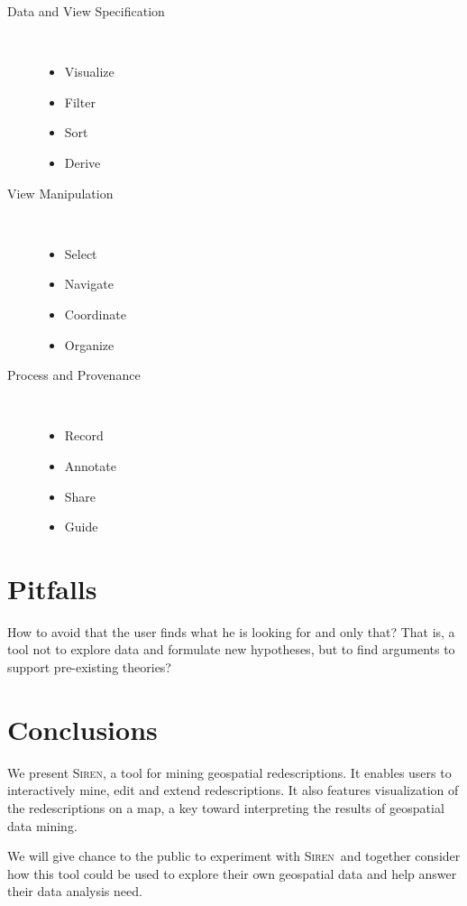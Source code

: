 \documentclass{llncs}
\newcommand{\Siren}{\textsc{Siren}}
\begin{document}
\begin{description}
\item[Data and View Specification]~
\begin{itemize}
\item Visualize
\item Filter
\item Sort
\item Derive
\end{itemize}
\item[View Manipulation]~
\begin{itemize}
\item Select
\item Navigate
\item Coordinate
\item Organize
\end{itemize}
\item[Process and Provenance]~
\begin{itemize}
\item Record
\item Annotate
\item Share
\item Guide
\end{itemize}
\end{description}

\section{Pitfalls}
How to avoid that the user finds what he is looking for and only that?
That is, a tool not to explore data and formulate new hypotheses, but to find arguments to support pre-existing theories?

\section{Conclusions}
We present \Siren, a tool for mining geospatial redescriptions. It enables
users to interactively mine, edit and extend redescriptions. It also
features visualization of the redescriptions on a map, a key toward
interpreting the results of geospatial data mining.

We will give chance to the public to experiment with \Siren\ and
together consider how this tool could be used to explore their own geospatial
data and help answer their data analysis need.


  
\end{document}
